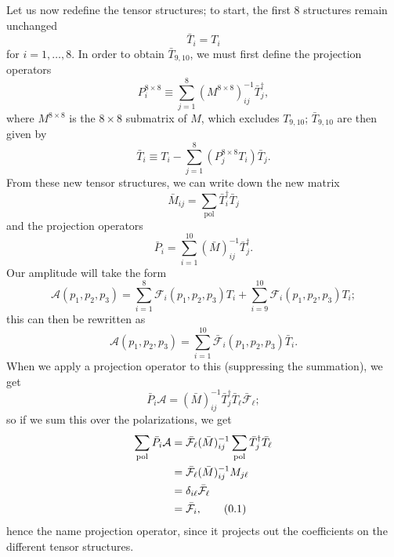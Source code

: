 \documentclass[12pt]{article}
\numberwithin{equation}{section}
\numberwithin{figure}{section}
\numberwithin{table}{section}
\newcommand{\numberthis}{\addtocounter{equation}{1}\tag{\theequation}}
\renewcommand{\theequation}{\arabic{section}.\arabic{equation}}
\begin{document}
	Let us now redefine the tensor structures; to start, the first 8 structures remain unchanged  
	\begin{equation}
	\bar{T}_i=T_i
	\end{equation}
	for \(i=1,\dots,8\). In order to obtain \(\bar{T}_{9,10}\), we must first define the projection operators  
	\begin{equation}
	P_i^{8\times 8}\equiv\sum_{j=1}^8(M^{8\times 8})_{ij}^{-1}\bar{T}_j^\dagger,
	\end{equation}
	where \(M^{8\times 8}\) is the \(8\times 8\) submatrix of \(M\), which excludes \(T_{9,10}\); \(\bar{T}_{9,10}\) are then given by  
	\begin{equation}
	\bar{T}_i\equiv T_i-\sum_{j=1}^8(P_j^{8\times 8}T_i)\bar{T}_j.
	\end{equation}
        From these new tensor structures, we can write down the new matrix 
	\begin{equation}
	\bar{M}_{ij}=\sum_\mathrm{pol}\bar{T}_i^\dagger\bar{T}_j
	\end{equation}
        and the projection operators 
	\begin{equation}
	\bar{P}_i=\sum_{i=1}^{10}(\bar{M})_{ij}^{-1}\bar{T}_j^\dagger.
	\end{equation}
        Our amplitude will take the form 
	\begin{equation}
	\mathcal{A}(p_1,p_2,p_3)=\sum_{i=1}^8\mathcal{F}_i(p_1,p_2,p_3)T_i+\sum_{i=9}^{10}\mathcal{F}_{i}(p_1,p_2,p_3)T_{i};
	\end{equation}
        this can then be rewritten as 
	\begin{equation}
	\mathcal{A}(p_1,p_2,p_3)=\sum_{i=1}^{10}\bar{\mathcal{F}}_i(p_1,p_2,p_3)\bar{T}_i.
	\end{equation}
        When we apply a projection operator to this (suppressing the summation), we get 
	\begin{equation}
	\bar{P}_i\mathcal{A}=(\bar{M})_{ij}^{-1}\bar{T}_j^\dagger\bar{T}_\ell\bar{\mathcal{F}}_\ell;
	\end{equation}
        so if we sum this over the polarizations, we get 
	\begin{align*}
	  \sum_{\mathrm{pol}}\bar{P}_i\mathcal{A} & =\bar{\mathcal{F}}_\ell(\bar{M})_{ij}^{-1}\sum_\mathrm{pol}\bar{T}_j^\dagger\bar{T}_\ell\\
          & =\bar{\mathcal{F}}_\ell(\bar{M})_{ij}^{-1}M_{j\ell}\\
          & =\delta_{i\ell}\bar{\mathcal{F}}_\ell\\
          & =\bar{\mathcal{F}}_i, \numberthis
	\end{align*}
        hence the name projection operator, since it projects out the coefficients on the different tensor structures.
\end{document}
